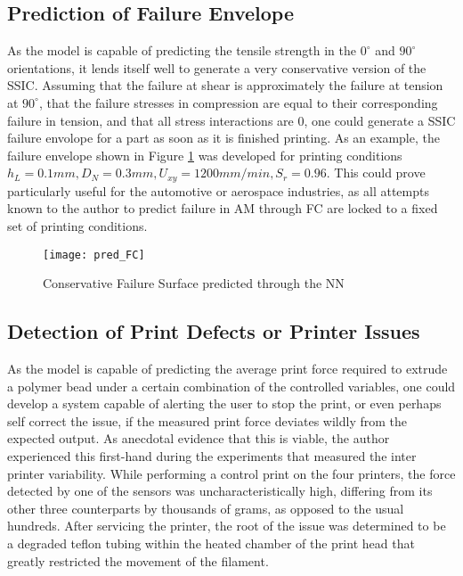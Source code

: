 \documentclass[main.tex]{subfiles}
\begin{document}
\subsection{Prediction of Failure Envelope}
As the model is capable of predicting the tensile strength in the $0^{\circ}$ and $90^{\circ}$ orientations, it lends itself well to generate a very conservative version of the SSIC. Assuming that the failure at shear is approximately the failure at tension at $90^{\circ}$, that the failure stresses in compression are equal to their corresponding failure in tension, and that all stress interactions are $0$, one could generate a SSIC failure envolope for a part as soon as it is finished printing. As an example, the failure envelope shown in Figure \ref{fig:fc_nn} was developed for printing conditions $h_{L}= 0.1 mm, D_{N}= 0.3 mm, U_{xy} = 1200 mm/min, S_r = 0.96$. This could prove particularly useful for the automotive or aerospace industries, as all attempts known to the author to predict failure in AM through FC are locked to a fixed set of printing conditions. 

\begin{figure}[!htbp]
	\center
	\texttt{[image: pred\_FC]}
	\caption{Conservative Failure Surface predicted through the NN} \label{fig:fc_nn}
\end{figure}

\subsection{Detection of Print Defects or Printer Issues}

As the model is capable of predicting the average print force required to extrude a polymer bead under a certain combination of the controlled variables, one could develop a system capable of alerting the user to stop the print, or even perhaps self correct the issue, if the measured print force deviates wildly from the expected output. As anecdotal evidence that this is viable, the author experienced this first-hand during the experiments that measured the inter printer variability. While performing a control print on the four printers, the force detected by one of the sensors was uncharacteristically high, differing from its other three counterparts by thousands of grams, as opposed to the usual hundreds. After servicing the printer, the root of the issue was determined to be a degraded teflon tubing within the heated chamber of the print head that greatly restricted the movement of the filament. 
\end{document}
